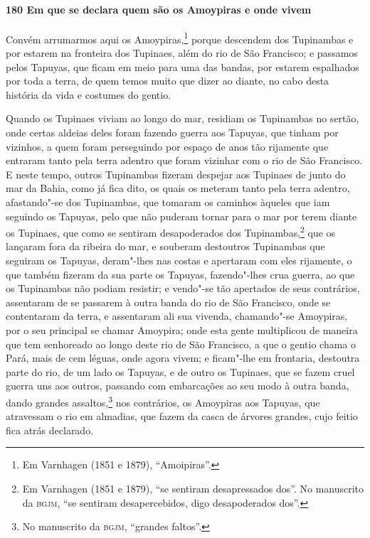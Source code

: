 \begin{linenumbers}
\paragraph{180 Em que se declara quem são os Amoypiras e onde vivem}\quad
Convém arrumarmos aqui os Amoypiras,\footnote{ Em Varnhagen (1851 e 1879), ``Amoipiras''.}
porque descendem dos Tupinambas e por estarem na fronteira dos Tupinaes, além do rio de
São Francisco; e passamos pelos Tapuyas, que ficam em meio para uma das bandas, por
estarem espalhados por toda a terra, de quem temos muito que dizer ao diante, no cabo
desta história da vida e costumes do gentio.

Quando os Tupinaes viviam ao longo do mar, residiam os Tupinambas no sertão, onde certas
aldeias deles foram fazendo guerra aos Tapuyas, que tinham por vizinhos, a quem foram
perseguindo por espaço de anos tão rijamente que entraram tanto pela terra adentro que
foram vizinhar com o rio de São Francisco. E neste tempo, outros Tupinambas fizeram
despejar aos Tupinaes de junto do mar da Bahia, como já fica dito, os quais os meteram
tanto pela terra adentro, afastando"-se dos Tupinambas, que tomaram os caminhos àqueles que
iam seguindo os Tapuyas, pelo que não puderam tornar para o mar por terem diante os
Tupinaes, que como se sentiram desapoderados dos Tupinambas,\footnote{ Em Varnhagen (1851
e 1879), ``se sentiram desapressados dos''. No manuscrito da \textsc{bgjm}, ``se sentiram
desapercebidos, digo desapoderados dos''.} que os lançaram fora da ribeira do mar, e
souberam destoutros Tupinambas que seguiram os Tapuyas, deram"-lhes nas costas e apertaram
com eles rijamente, o que também fizeram da sua parte os Tapuyas, fazendo"-lhes crua
guerra, ao que os Tupinambas não podiam resistir; e vendo"-se tão apertados de seus
contrários, assentaram de se passarem à outra banda do rio de São Francisco, onde se
contentaram da terra, e assentaram ali sua vivenda, chamando"-se Amoypiras, por o seu
principal se chamar Amoypira; onde esta gente multiplicou de maneira que tem senhoreado ao
longo deste rio de São Francisco, a que o gentio chama o Pará, mais de cem léguas, onde
agora vivem; e ficam"-lhe em frontaria, destoutra parte do rio, de um lado os Tapuyas, e de
outro os Tupinaes, que se fazem cruel guerra uns aos outros, passando com embarcações ao
seu modo à outra banda, dando grandes assaltos,\footnote{ No manuscrito da \textsc{bgjm},
``grandes faltos''.} nos contrários, os Amoypiras aos Tapuyas, que atravessam o rio em
almadias, que fazem da casca de árvores grandes, cujo feitio fica atrás declarado.


\end{linenumbers}
